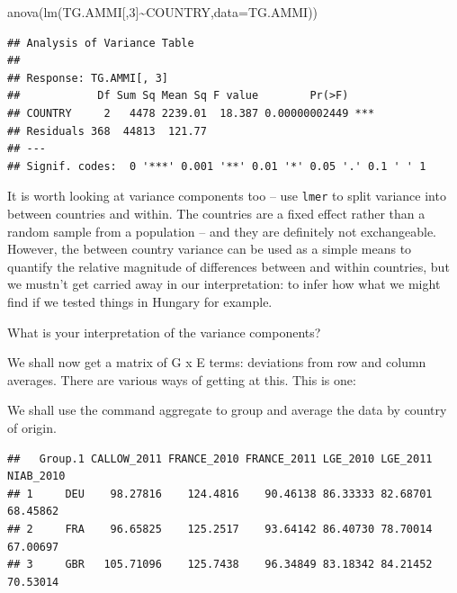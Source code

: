 \documentclass[
]{book}
\newenvironment{Shaded}{\begin{snugshade}}{\end{snugshade}}
\newcommand{\AttributeTok}[1]{\textcolor[rgb]{0.77,0.63,0.00}{#1}}
\newcommand{\DecValTok}[1]{\textcolor[rgb]{0.00,0.00,0.81}{#1}}
\newcommand{\FunctionTok}[1]{\textcolor[rgb]{0.00,0.00,0.00}{#1}}
\newcommand{\NormalTok}[1]{#1}
\newcommand{\OtherTok}[1]{\textcolor[rgb]{0.56,0.35,0.01}{#1}}
\newcommand{\SpecialCharTok}[1]{\textcolor[rgb]{0.00,0.00,0.00}{#1}}
\begin{document}
\begin{Shaded}
\begin{Highlighting}[]
\FunctionTok{anova}\NormalTok{(}\FunctionTok{lm}\NormalTok{(TG.AMMI[,}\DecValTok{3}\NormalTok{]}\SpecialCharTok{\textasciitilde{}}\NormalTok{COUNTRY,}\AttributeTok{data=}\NormalTok{TG.AMMI))}
\end{Highlighting}
\end{Shaded}

\begin{verbatim}
## Analysis of Variance Table
## 
## Response: TG.AMMI[, 3]
##            Df Sum Sq Mean Sq F value        Pr(>F)    
## COUNTRY     2   4478 2239.01  18.387 0.00000002449 ***
## Residuals 368  44813  121.77                          
## ---
## Signif. codes:  0 '***' 0.001 '**' 0.01 '*' 0.05 '.' 0.1 ' ' 1
\end{verbatim}

It is worth looking at variance components too -- use \texttt{lmer} to split variance into between countries and within. The countries are a fixed effect rather than a random sample from a population -- and they are definitely not exchangeable. However, the between country variance can be used as a simple means to quantify the relative magnitude of differences between and within countries, but we mustn't get carried away in our interpretation: to infer how what we might find if we tested things in Hungary for example.

What is your interpretation of the variance components?

We shall now get a matrix of G x E terms: deviations from row and column averages. There are various ways of getting at this. This is one:

We shall use the command aggregate to group and average the data by country of origin.

\begin{Shaded}
\end{Shaded}

\begin{verbatim}
##   Group.1 CALLOW_2011 FRANCE_2010 FRANCE_2011 LGE_2010 LGE_2011 NIAB_2010
## 1     DEU    98.27816    124.4816    90.46138 86.33333 82.68701  68.45862
## 2     FRA    96.65825    125.2517    93.64142 86.40730 78.70014  67.00697
## 3     GBR   105.71096    125.7438    96.34849 83.18342 84.21452  70.53014
\end{verbatim}
\end{document}
